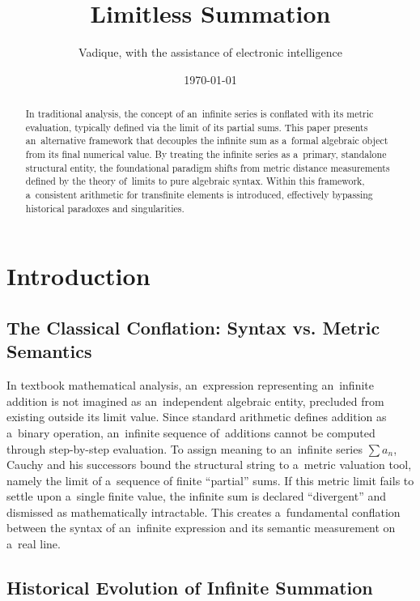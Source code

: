 \documentclass[11pt,a4paper]{article}
\title{\textbf{Limitless Summation}}
\author{Vadique, with the assistance of electronic intelligence}
\date{\today}
\theoremstyle{definition}
\theoremstyle{noperiod}
\begin{document}
\maketitle

\begin{abstract}
In traditional analysis, the concept of an~infinite series is conflated with its metric evaluation,
typically defined via the limit of its partial sums. This paper presents an~alternative framework
that decouples the infinite sum as a~formal algebraic object from its final numerical value.
By treating the infinite series as a~primary, standalone structural entity, the foundational paradigm
shifts from metric distance measurements defined by the theory of~limits to pure algebraic syntax.
Within this framework, a~consistent arithmetic for transfinite elements is introduced,
effectively bypassing historical paradoxes and singularities.
\end{abstract}

\thispagestyle{empty}

\section{Introduction}

\subsection{The Classical Conflation: Syntax vs. Metric Semantics}

In textbook mathematical analysis, an~expression representing an~infinite addition is not imagined as an~independent algebraic entity, precluded from existing outside its limit value.
Since standard arithmetic defines addition as a~binary operation, an~infinite sequence of~additions cannot be computed through step-by-step evaluation.
To assign meaning to an~infinite series $\sum a_n$, Cauchy and his successors bound the structural string to a~metric valuation tool, namely the limit of a~sequence of finite ``partial'' sums.
If this metric limit fails to settle upon a~single finite value, the infinite sum is declared ``divergent'' and dismissed as mathematically intractable.
This creates a~fundamental conflation between the syntax of an~infinite expression and its semantic measurement on a~real line.

\subsection{Historical Evolution of Infinite Summation}
\end{document}

